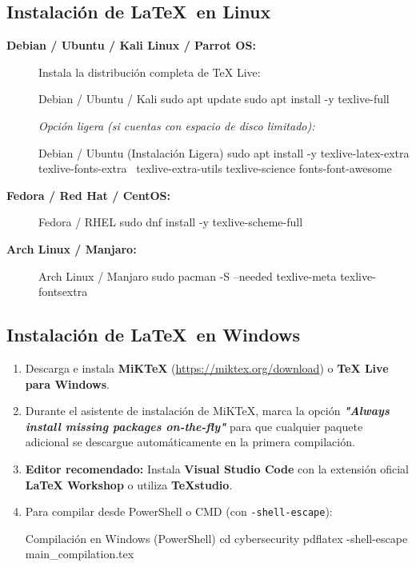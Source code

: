 \documentclass[../../main_compilation.tex]{subfiles}
\begin{document}
\subsection{Instalación de \LaTeX\ en Linux}
\begin{description}
	\item[\textbf{Debian / Ubuntu / Kali Linux / Parrot OS:}]
	      Instala la distribución completa de TeX Live:
	      \begin{bashbox}{Debian / Ubuntu / Kali}
		      sudo apt update
		      sudo apt install -y texlive-full
	      \end{bashbox}
	      \textit{Opción ligera (si cuentas con espacio de disco limitado):}
	      \begin{bashbox}{Debian / Ubuntu (Instalación Ligera)}
		      sudo apt install -y texlive-latex-extra texlive-fonts-extra \
		      texlive-extra-utils texlive-science fonts-font-awesome
	      \end{bashbox}

	\item[\textbf{Fedora / Red Hat / CentOS:}]
	      \quad%
	      \begin{bashbox}{Fedora / RHEL}
		      sudo dnf install -y texlive-scheme-full
	      \end{bashbox}

	\item[\textbf{Arch Linux / Manjaro:}]
	      \quad%
	      \begin{bashbox}{Arch Linux / Manjaro}
		      sudo pacman -S --needed texlive-meta texlive-fontsextra
	      \end{bashbox}
\end{description}

\subsection{Instalación de \LaTeX\ en Windows}
\begin{enumerate}
	\item Descarga e instala \textbf{MiKTeX} (\url{https://miktex.org/download}) o \textbf{TeX Live para Windows}.
	\item Durante el asistente de instalación de MiKTeX, marca la opción \textbf{\textit{"Always install missing packages on-the-fly"}} para que cualquier paquete adicional se descargue automáticamente en la primera compilación.
	\item \textbf{Editor recomendado:} Instala \textbf{Visual Studio Code} con la extensión oficial \textbf{LaTeX Workshop} o utiliza \textbf{TeXstudio}.
	\item Para compilar desde PowerShell o CMD (con \texttt{-shell-escape}):
	      \begin{bashbox}{Compilación en Windows (PowerShell)}
		      cd cybersecurity
		      pdflatex -shell-escape main_compilation.tex
	      \end{bashbox}
\end{enumerate}
\end{document}
